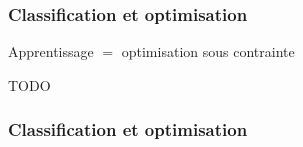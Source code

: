 \documentclass{beamer}
\begin{document}
\begin{frame}
  \frametitle{Classification et optimisation}

  \begin{block}{Apprentissage $=$ optimisation sous contrainte}

    TODO
    

  \end{block}
  
\end{frame}

\begin{frame}
  \frametitle{Classification et optimisation}
  
\end{frame}



  
\end{document}

